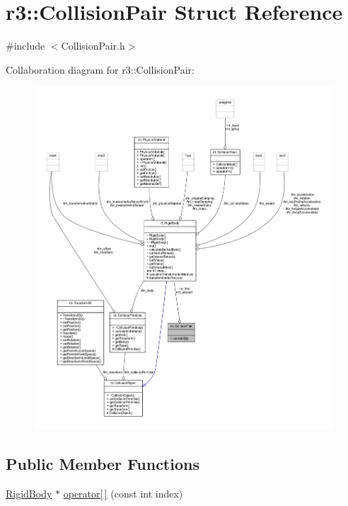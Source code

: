 \hypertarget{structr3_1_1_collision_pair}{}\section{r3\+:\+:Collision\+Pair Struct Reference}
\label{structr3_1_1_collision_pair}


{\ttfamily \#include $<$Collision\+Pair.\+h$>$}



Collaboration diagram for r3\+:\+:Collision\+Pair\+:\nopagebreak
\begin{figure}[H]
\begin{center}
\leavevmode
\includegraphics[width=350pt]{structr3_1_1_collision_pair__coll__graph}
\end{center}
\end{figure}
\subsection*{Public Member Functions}
\begin{DoxyCompactItemize}
\item 
\mbox{\hyperlink{classr3_1_1_rigid_body}{Rigid\+Body}} $\ast$ \mbox{\hyperlink{structr3_1_1_collision_pair_ae6b965e4d3525253b9b1e3270e8665e8}{operator\mbox{[}$\,$\mbox{]}}} (const int index)
\end{DoxyCompactItemize}
